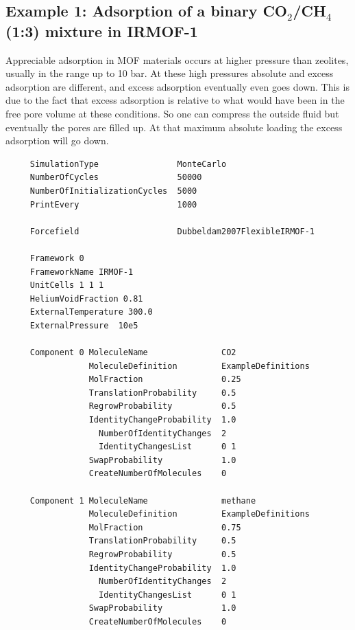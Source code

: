 \subsection*{Example 1: Adsorption of a binary CO$_2$/CH$_4$ (1:3) mixture in IRMOF-1}

Appreciable adsorption in MOF materials occurs at higher pressure than zeolites, usually in the range up to 10 bar. At these high pressures
absolute and excess adsorption are different, and excess adsorption eventually even goes down. This is due to the fact that excess adsorption is relative
to what would have been in the free pore volume at these conditions. So one can compress the outside fluid but eventually the pores are filled up. At that
maximum absolute loading the excess adsorption will go down.
\begin{tiny}
\begin{verbatim}
     SimulationType                MonteCarlo
     NumberOfCycles                50000
     NumberOfInitializationCycles  5000
     PrintEvery                    1000
     
     Forcefield                    Dubbeldam2007FlexibleIRMOF-1
     
     Framework 0
     FrameworkName IRMOF-1
     UnitCells 1 1 1
     HeliumVoidFraction 0.81
     ExternalTemperature 300.0
     ExternalPressure  10e5
     
     Component 0 MoleculeName               CO2
                 MoleculeDefinition         ExampleDefinitions
                 MolFraction                0.25
                 TranslationProbability     0.5
                 RegrowProbability          0.5
                 IdentityChangeProbability  1.0
                   NumberOfIdentityChanges  2
                   IdentityChangesList      0 1
                 SwapProbability            1.0
                 CreateNumberOfMolecules    0
     
     Component 1 MoleculeName               methane
                 MoleculeDefinition         ExampleDefinitions
                 MolFraction                0.75
                 TranslationProbability     0.5
                 RegrowProbability          0.5
                 IdentityChangeProbability  1.0
                   NumberOfIdentityChanges  2
                   IdentityChangesList      0 1
                 SwapProbability            1.0
                 CreateNumberOfMolecules    0
\end{verbatim}
\end{tiny}

